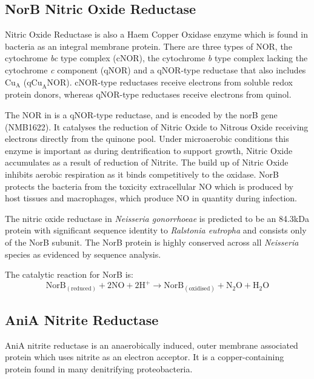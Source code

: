 \subsection{NorB Nitric Oxide Reductase}
Nitric Oxide Reductase is also a Haem Copper Oxidase enzyme which is found in bacteria as an integral membrane protein. There are three types of NOR, the cytochrome \textit{bc} type complex (cNOR), the cytochrome \textit{b} type complex lacking the cytochrome \textit{c} component (qNOR) and a qNOR-type reductase that also includes $\mathrm{Cu}_{\mathrm{A}}$ ($\mathrm{qCu}_{\mathrm{A}}\mathrm{NOR}$). cNOR-type reductases receive electrons from soluble redox protein donors, whereas qNOR-type reductases receive electrons from quinol\cite{Householder2000}.

The NOR in \Nm{} is a qNOR-type reductase, and is encoded by the norB gene (NMB1622). It catalyses the reduction of Nitric Oxide to Nitrous Oxide receiving electrons directly from the quinone pool. Under microaerobic conditions this enzyme is important as during dentrification to support growth, Nitric Oxide accumulates as a result of reduction of Nitrite. The build up of Nitric Oxide inhibits aerobic respiration as it binds competitively to the \cbbthree{} oxidase. NorB protects the bacteria from the toxicity extracellular NO which is produced by host tissues and macrophages, which produce NO in quantity during infection\cite{Heurlier2008}.

The nitric oxide reductase in \textit{Neisseria gonorrhoeae} is predicted to be an 84.3kDa protein with significant sequence identity to \textit{Ralstonia eutropha} and consists only of the NorB subunit\cite{Householder2000}. The NorB protein is highly conserved across all \textit{Neisseria} species as evidenced by sequence analysis\cite{Barth2009}.

The catalytic reaction for NorB is:
\begin{equation}
\mathrm{NorB}_{\mathrm{(reduced)}} + 2\mathrm{NO} + 2\mathrm{H}^+ \rightarrow \mathrm{NorB}_{\mathrm{(oxidised)}} + \mathrm{N}_2\mathrm{O} + \mathrm{H}_2\mathrm{O}
\end{equation}

\subsection{AniA Nitrite Reductase}
AniA nitrite reductase is an anaerobically induced, outer membrane associated protein which uses nitrite as an electron acceptor\cite{Clark1987}. It is a copper-containing protein found in many denitrifying proteobacteria.

